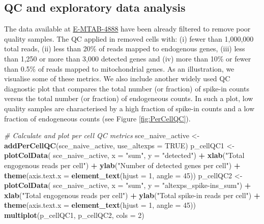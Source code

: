 \documentclass[9pt,a4paper,]{extarticle}
\newenvironment{Shaded}{\begin{snugshade}}{\end{snugshade}}
\newcommand{\CommentTok}[1]{\textcolor[rgb]{0.56,0.35,0.01}{\textit{#1}}}
\newcommand{\DataTypeTok}[1]{\textcolor[rgb]{0.13,0.29,0.53}{#1}}
\newcommand{\DecValTok}[1]{\textcolor[rgb]{0.00,0.00,0.81}{#1}}
\newcommand{\KeywordTok}[1]{\textcolor[rgb]{0.13,0.29,0.53}{\textbf{#1}}}
\newcommand{\NormalTok}[1]{#1}
\newcommand{\OperatorTok}[1]{\textcolor[rgb]{0.81,0.36,0.00}{\textbf{#1}}}
\newcommand{\OtherTok}[1]{\textcolor[rgb]{0.56,0.35,0.01}{#1}}
\newcommand{\StringTok}[1]{\textcolor[rgb]{0.31,0.60,0.02}{#1}}
\begin{document}
\hypertarget{qc-and-exploratory-data-analysis-1}{%
\subsection{QC and exploratory data analysis}\label{qc-and-exploratory-data-analysis-1}}

The data available at
\href{https://www.ebi.ac.uk/arrayexpress/experiments/E-MTAB-4888/}{E-MTAB-4888} have
been already filtered to remove poor quality samples.
The QC applied in \citep{Martinez-jimenez2017} removed cells with: (i) fewer
than 1,000,000 total reads, (ii) less than 20\% of reads mapped to
endogenous genes, (iii) less than 1,250 or more than 3,000 detected genes and
(iv) more than 10\% or fewer than 0.5\% of reads mapped to mitochondrial genes.
As an illustration, we visualise some of these metrics.
We also include another widely used QC diagnostic plot that compares the total
number (or fraction) of spike-in counts versus the total number (or fraction) of
endogeneous counts.
In such a plot, low quality samples are characterised by a high fraction of
spike-in counts and a low fraction of endogeneous counts
(see Figure \ref{fig:PerCellQC}).

\begin{Shaded}
\begin{Highlighting}[]
\CommentTok{# Calculate and plot per cell QC metrics}
\NormalTok{sce_naive_active <-}\StringTok{ }\KeywordTok{addPerCellQC}\NormalTok{(sce_naive_active, }\DataTypeTok{use_altexps =} \OtherTok{TRUE}\NormalTok{)}
\NormalTok{p_cellQC1 <-}\StringTok{ }\KeywordTok{plotColData}\NormalTok{(}
\NormalTok{  sce_naive_active, }
  \DataTypeTok{x =} \StringTok{"sum"}\NormalTok{, }
  \DataTypeTok{y =} \StringTok{"detected"}\NormalTok{) }\OperatorTok{+}
\StringTok{  }\KeywordTok{xlab}\NormalTok{(}\StringTok{"Total engogenous reads per cell"}\NormalTok{) }\OperatorTok{+}
\StringTok{  }\KeywordTok{ylab}\NormalTok{(}\StringTok{"Number of detected genes per cell"}\NormalTok{) }\OperatorTok{+}
\StringTok{  }\KeywordTok{theme}\NormalTok{(}\DataTypeTok{axis.text.x =} \KeywordTok{element_text}\NormalTok{(}\DataTypeTok{hjust =} \DecValTok{1}\NormalTok{, }\DataTypeTok{angle =} \DecValTok{45}\NormalTok{))}
\NormalTok{p_cellQC2 <-}\StringTok{ }\KeywordTok{plotColData}\NormalTok{(}
\NormalTok{  sce_naive_active, }
  \DataTypeTok{x =} \StringTok{"sum"}\NormalTok{, }
  \DataTypeTok{y =} \StringTok{"altexps_spike-ins_sum"}\NormalTok{) }\OperatorTok{+}
\StringTok{  }\KeywordTok{xlab}\NormalTok{(}\StringTok{"Total engogenous reads per cell"}\NormalTok{) }\OperatorTok{+}
\StringTok{  }\KeywordTok{ylab}\NormalTok{(}\StringTok{"Total spike-in reads per cell"}\NormalTok{) }\OperatorTok{+}
\StringTok{  }\KeywordTok{theme}\NormalTok{(}\DataTypeTok{axis.text.x =} \KeywordTok{element_text}\NormalTok{(}\DataTypeTok{hjust =} \DecValTok{1}\NormalTok{, }\DataTypeTok{angle =} \DecValTok{45}\NormalTok{))}
\KeywordTok{multiplot}\NormalTok{(p_cellQC1, p_cellQC2, }\DataTypeTok{cols =} \DecValTok{2}\NormalTok{)}
\end{Highlighting}
\end{Shaded}
\end{document}
